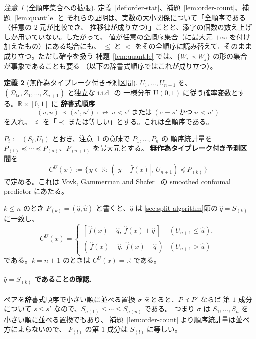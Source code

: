 \documentclass[a4paper,11pt]{jsarticle}
\theoremstyle{definition}
\newtheorem{definition}{定義}[section]
\theoremstyle{plain}
\theoremstyle{remark}
\newtheorem{remark}[definition]{注意}
\newcommand{\Real}{\mathbb{R}}
\newcommand{\Dtr}{\mathcal{D}_{\mathrm{tr}}}     %
\newcommand{\qhat}{\hat{q}}
\newcommand{\fhat}{\hat{f}}
\begin{document}
\begin{remark}[全順序集合への拡張]
  \label{rem:total-order}
  定義~\ref{def:order-stat}、補題~\ref{lem:order-count}、補題~\ref{lem:quantile} と
  それらの証明は、実数の大小関係について「全順序である（任意の $2$ 元が比較でき、
  推移律が成り立つ）」ことと、添字の個数の数え上げしか用いていない。したがって、
  値が任意の全順序集合（に最大元 $+\infty$ を付け加えたもの）にある場合にも、
  $\le$ と $<$ をその全順序に読み替えて、そのまま成り立つ。ただし確率を扱う
  補題~\ref{lem:quantile} では、$\{W_i\prec W_j\}$ の形の集合が事象であることも要る
  （以下の辞書式順序ではこれが成り立つ）。
\end{remark}

\begin{definition}[無作為タイブレーク付き予測区間]
  \label{def:random-tiebreak}
  $U_1,\dots,U_{n+1}$ を、$(\Dtr,Z_1,\dots,Z_{n+1})$ と独立な i.i.d.\ の
  一様分布 $\mathrm{U}(0,1)$ に従う確率変数とする。$\Real\times[0,1]$ に
  \textbf{辞書式順序}
  \begin{equation*}
    (s,u)\prec(s',u')\ :\iff\ s<s'\ \text{または}\ (s=s'\ \text{かつ}\ u<u')
  \end{equation*}
  を入れ、$\preceq$ を「$\prec$ または等しい」とする。これは全順序である。

  $P_i:=(S_i,U_i)$ とおき、注意~\ref{rem:total-order} の意味で $P_1,\dots,P_n$ の
  順序統計量を $P_{(1)}\preceq\cdots\preceq P_{(n)}$、$P_{(n+1)}$ を最大元とする。
  \textbf{無作為タイブレーク付き予測区間}を
  \begin{equation}
    \label{eq:random-tiebreak}
    C^U(x):=\bigl\{\,y\in\Real:\ (|y-\fhat(x)|,\ U_{n+1})\preceq P_{(k)}\,\bigr\}
  \end{equation}
  で定める。これは Vovk, Gammerman and Shafer~\cite{vovk2005algorithmic} の
  smoothed conformal predictor にあたる。
\end{definition}

$k\le n$ のとき $P_{(k)}=(\qhat,\hat u)$ と書くと、$\qhat$ は
\ref{sec:split-algorithm}節の $\qhat=S_{(k)}$ に一致し、
\begin{equation*}
  C^U(x)=\begin{cases}
    [\,\fhat(x)-\qhat,\ \fhat(x)+\qhat\,] & (U_{n+1}\le\hat u),\\[2pt]
    (\,\fhat(x)-\qhat,\ \fhat(x)+\qhat\,) & (U_{n+1}>\hat u)
  \end{cases}
\end{equation*}
である。$k=n+1$ のときは $C^U(x)=\Real$ である。

\paragraph{$\qhat=S_{(k)}$ であることの確認.}
ペアを辞書式順序で小さい順に並べる置換 $\sigma$ をとると、$P\preceq P'$ ならば
第 $1$ 成分について $s\le s'$ なので、$S_{\sigma(1)}\le\cdots\le S_{\sigma(n)}$ である。
つまり $\sigma$ は $S_1,\dots,S_n$ を小さい順に並べる置換でもあり、
補題~\ref{lem:order-count} より順序統計量は並べ方によらないので、
$P_{(l)}$ の第 $1$ 成分は $S_{(l)}$ に等しい。
\end{document}
